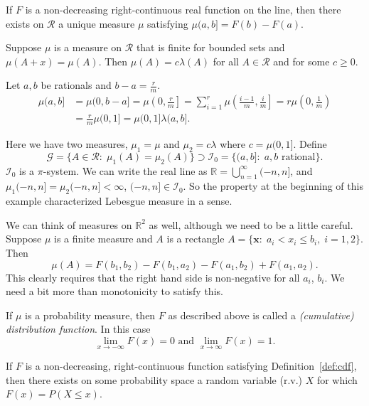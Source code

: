 \documentclass[11pt,fleqn]{book} %
\begin{document}
\begin{theorem} \label{thm:distribution-function-exists}
	If $F$ is a non-decreasing right-continuous real function on the line, then there exists on $\mathcal{R}$ a unique measure $\mu$ satisfying $\mu(a,b] = F(b)-F(a)$.
\end{theorem}

\begin{example}[Problem 12.1] \label{ex:12.1}
	Suppose $\mu$ is a measure on $\mathcal{R}$ that is finite for bounded sets and $\mu(A+x) = \mu(A)$. Then $\mu(A) = c \lambda(A)$ for all $A \in \mathcal{R}$ and for some $c \geq 0$.

	Let $a,b$ be rationals and $b-a = \frac{r}{m}$.
	\begin{align*}
		\mu(a,b] &= \mu(0,b-a] = \mu \left( 0,\frac{r}{m} \right] = \sum_{i=1}^r \mu \left( \frac{i-1}{m}, \frac{i}{m} \right] = r \mu \left( 0, \frac{1}{m} \right) \\
		&= \frac{r}{m} \mu(0,1] = \mu(0,1] \lambda(a,b].
	\end{align*}

	Here we have two measures, $\mu_1 = \mu$ and $\mu_2 = c\lambda$ where $c = \mu(0,1]$. Define
	\[
		\mathcal{G} = \{A \in \mathcal{R}:\;\mu_1(A) = \mu_2(A)\} \supset \mathcal{I}_0 = \{(a,b]:\;a,b \textrm{ rational}\}.
	\]
	$\mathcal{I}_0$ is a $\pi$-system. We can write the real line as $\mathbb{R} = \bigcup_{n=1}^\infty (-n,n]$, and $\mu_1(-n,n] = \mu_2(-n,n] < \infty$, $(-n,n] \in \mathcal{I}_0$. So the property at the beginning of this example characterized Lebesgue measure in a sense.
\end{example}

We can think of measures on $\mathbb{R}^2$ as well, although we need to be a little careful. Suppose $\mu$ is a finite measure and $A$ is a rectangle $A = \{\bm{x}:\;a_i < x_i \leq b_i,\;i=1,2\}$. Then
\[
	\mu(A) = F(b_1,b_2) - F(b_1,a_2) - F(a_1,b_2) + F(a_1,a_2).
\]
This clearly requires that the right hand side is non-negative for all $a_i$, $b_i$. We need a bit more than monotonicity to satisfy this.

\begin{definition} \label{def:cdf}
	If $\mu$ is a probability measure, then $F$ as described above is called a \emph{(cumulative) distribution function}. In this case
	\[
		\lim_{x \to -\infty} F(x) = 0 \textrm{ and } \lim_{x \to \infty} F(x) = 1.
	\]
\end{definition}

\begin{theorem} \label{thm:cdf-exists}
	If $F$ is a non-decreasing, right-continuous function satisfying Definition~\ref{def:cdf}, then there exists on some probability space a random variable (r.v.) $X$ for which $F(x) = P(X \leq x)$.
\end{theorem}
\end{document}

